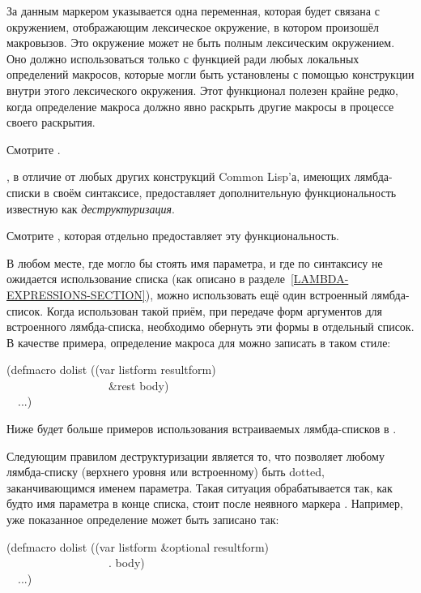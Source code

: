 \begin{defmac}
\begin{indentdesc}{6pc}
\item[\cd{\&environment}]

За данным маркером указывается одна переменная, которая будет связана с
окружением, отображающим лексическое окружение, в котором произошёл
макровызов. Это окружение может не быть полным лексическим окружением. Оно
должно использоваться только с функцией  ради любых локальных
определений макросов, которые могли быть установлены с помощью 
конструкции внутри этого лексического окружения. Этот функционал полезен крайне
редко, когда определение макроса должно явно раскрыть другие макросы в процессе
своего раскрытия.
\end{indentdesc}

Смотрите .

, в отличие от любых других конструкций Common Lisp'а, имеющих
лямбда-списки в своём синтаксисе, предоставляет дополнительную функциональность
известную как \emph{деструктуризация}.

Смотрите , которая отдельно предоставляет эту функциональность.

В любом месте, где могло бы стоять имя параметра, и где по синтаксису не
ожидается использование списка (как описано в
разделе~\ref{LAMBDA-EXPRESSIONS-SECTION}), можно использовать ещё один
встроенный лямбда-список. Когда использован такой приём, при передаче форм
аргументов для встроенного лямбда-списка, необходимо обернуть эти формы в
отдельный список.
В качестве примера, определение макроса для  можно записать в таком
стиле:
\begin{lisp}
(defmacro dolist ((var listform  resultform) \\
~~~~~~~~~~~~~~~~~~\&rest body) \\
~~...)
\end{lisp}
Ниже будет больше примеров использования встраиваемых лямбда-списков в
.

Следующим правилом деструктуризации является то, что  позволяет
любому лямбда-списку (верхнего уровня или встроенному) быть dotted,
заканчивающимся именем параметра. Такая ситуация обрабатывается так, как будто
имя параметра в конце списка, стоит после неявного маркера .
Например, уже показанное определение  может быть записано так:
\begin{lisp}
(defmacro dolist ((var listform \&optional resultform) \\
~~~~~~~~~~~~~~~~~~. body) \\
~~...)
\end{lisp}


\end{defmac}
